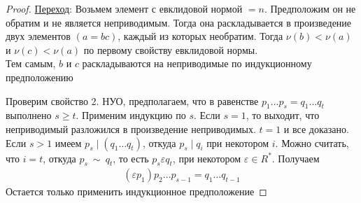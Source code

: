 \begin{normalsize}
\begin{proof}
        \underline{Переход}: Возьмем элемент с евклидовой нормой $= n$. Предположим он не обратим и не является неприводимым. Тогда она раскладывается 
        в произведение двух элементов $(a = bc)$, каждый из которых необратим. Тогда $\nu(b) < \nu(a)$ и $\nu(c) < \nu(a)$ по первому свойству евклидовой нормы. \\
        Тем самым, $b$ и $c$ раскладываются на неприводимые по индукционному предположению 

        Проверим свойство 2. НУО, предполагаем, что в равенстве $p_1 \dots p_s = q_1 \dots q_t$ выполнено $s \geqslant t$.
        Применим индукцию по $s$. Если $s = 1$, то выходит, что неприводимый разложился в произведение неприводимых. $t = 1$ и все доказано.
        Если $s > 1$ имеем $p_s \mid (q_1 \dots q_t)$, откуда $p_s \mid q_i$ при некотором $i$. Можно считать, что $i = t$, откуда $p_s \  \mathtt{\sim} \  q_t$,  то есть 
        $p_s \varepsilon q_t$, при некотором $\varepsilon \in R^*$. Получаем 
        \begin{gather*}
            (\varepsilon p_1)p_2 \dots p_{s - 1} = q_1 \dots q_{t - 1}
        \end{gather*}
        Остается только применить индукционное предположение
    \end{proof}
\end{normalsize}